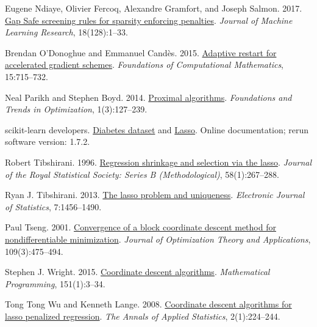 \begin{thebibliography}{}
Eugene Ndiaye, Olivier Fercoq, Alexandre Gramfort, and Joseph Salmon. 2017.
\href{https://jmlr.org/papers/v18/16-577.html}{Gap Safe screening rules for sparsity enforcing penalties}.
\emph{Journal of Machine Learning Research}, 18(128):1--33.

Brendan O'Donoghue and Emmanuel Cand\`es. 2015.
\href{https://doi.org/10.1007/s10208-013-9150-3}{Adaptive restart for accelerated gradient schemes}.
\emph{Foundations of Computational Mathematics}, 15:715--732.

Neal Parikh and Stephen Boyd. 2014.
\href{https://doi.org/10.1561/2400000003}{Proximal algorithms}.
\emph{Foundations and Trends in Optimization}, 1(3):127--239.

scikit-learn developers.
\href{https://scikit-learn.org/stable/modules/generated/sklearn.datasets.load_diabetes.html}{Diabetes dataset}
and \href{https://scikit-learn.org/stable/modules/generated/sklearn.linear_model.Lasso.html}{Lasso}.
Online documentation; rerun software version: 1.7.2.

Robert Tibshirani. 1996.
\href{https://doi.org/10.1111/j.2517-6161.1996.tb02080.x}{Regression shrinkage and selection via the lasso}.
\emph{Journal of the Royal Statistical Society: Series B (Methodological)}, 58(1):267--288.

Ryan J. Tibshirani. 2013.
\href{https://doi.org/10.1214/13-EJS815}{The lasso problem and uniqueness}.
\emph{Electronic Journal of Statistics}, 7:1456--1490.

Paul Tseng. 2001.
\href{https://doi.org/10.1023/A:1017501703105}{Convergence of a block coordinate descent method for nondifferentiable minimization}.
\emph{Journal of Optimization Theory and Applications}, 109(3):475--494.

Stephen J. Wright. 2015.
\href{https://doi.org/10.1007/s10107-015-0892-3}{Coordinate descent algorithms}.
\emph{Mathematical Programming}, 151(1):3--34.

Tong Tong Wu and Kenneth Lange. 2008.
\href{https://doi.org/10.1214/07-AOAS147}{Coordinate descent algorithms for lasso penalized regression}.
\emph{The Annals of Applied Statistics}, 2(1):224--244.


\end{thebibliography}
